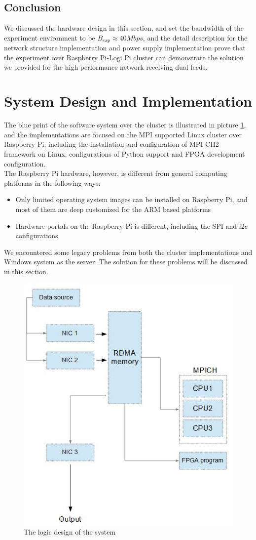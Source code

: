 \documentclass[11pt,openright,a4paper]{report}
\begin{document}
\subsection{Conclusion}
We discussed the hardware design in this section, and set the bandwidth of the experiment environment to be $B_{exp} \approx 40Mbps$, and the detail description for the network structure implementation and power supply implementation prove that the experiment over Raspberry Pi-Logi Pi cluster can demonstrate the solution we provided for the high performance network receiving dual feeds.\\ 
\section{System Design and Implementation}
The blue print of the software system over the cluster is illustrated in picture \ref{fig:LogicDesign}, and the implementations are focused on the MPI supported Linux cluster over Raspberry Pi, including the installation and configuration of MPI-CH2 framework on Linux, configurations of Python support and FPGA development configuration.\\
The Raspberry Pi hardware, however, is different from general computing platforms in the following ways:
\begin{itemize}
	\item Only limited operating system images can be installed on Raspberry Pi, and most of them are deep customized for the ARM based platforms
	\item Hardware portals on the Raspberry Pi is different, including the SPI and i2c configurations
\end{itemize}
We encountered some legacy problems from both the cluster implementations and Windows system as the server. The solution for these problems will be discussed in this section.\\
\begin{figure}[H]
	\centering
	\includegraphics[width=0.5\linewidth]{picture/LogicDesign}
	\caption{The logic design of the system}
	\label{fig:LogicDesign}
\end{figure}
\end{document}
